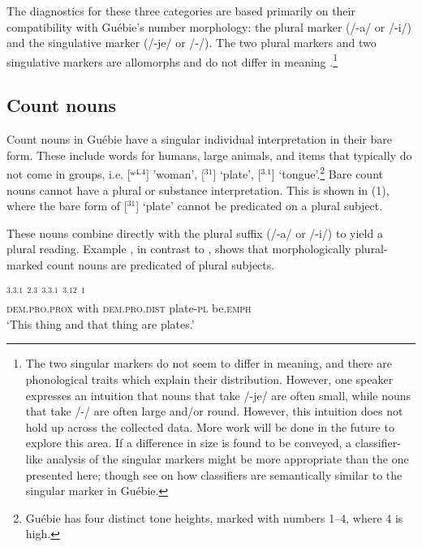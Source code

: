 \documentclass[output=paper,colorlinks,citecolor=brown]{langscibook}
\begin{document}
The diagnostics for these three categories are based primarily on their compatibility with Guébie's number morphology: the plural marker (/-a/ or /-i/) and the singulative marker (/-je/ or /-/). The two plural markers and two singulative markers are allomorphs and do not differ in meaning \citep{Sande2017}.\footnote{The two singular markers do not seem to differ in meaning, and there are phonological traits which explain their distribution. However, one speaker expresses an intuition that nouns that take /-je/ are often small, while nouns that take /-/ are often large and/or round. However, this intuition does not hold up across the collected data. More work will be done in the future to explore this area. If a difference in size is found to be conveyed, a classifier-like analysis of the singular markers might be more appropriate than the one presented here; though see  on how classifiers are semantically similar to the singular marker in Guébie.}

\subsection{Count nouns}\label{sec:sande:2.1}

Count nouns in Guébie have a singular individual interpretation in their bare form. These include words for humans, large animals, and items that typically do not come in groups, i.e. [ʷ$^{4.4}$] 'woman', [$^{31}$]  `plate', [$^{3.1}$] `tongue'.\footnote{Guébie has four distinct tone heights, marked with numbers 1--4, where 4 is high.} Bare count nouns cannot have a plural or substance interpretation. This is shown in (1), where the bare form of [$^{31}$] `plate' cannot be predicated on a plural subject.

\z

These nouns combine directly with the plural suffix (/-a/ or /-i/) to yield a plural reading. Example , in contrast to , shows that morphologically plural-marked count nouns are predicated of plural subjects.

\ea%
    \label{ex:sande:2}
    \gll    {}$^{3.3.1}$ $^{2.3}$ $^{3.3.1}$ $^{3.12}$ $^{1}$\\
	        \textsc{dem.pro.prox} with \textsc{dem.pro.dist} plate\textsc{-pl} be.\textsc{emph}\\
	\glt    `This thing and that thing are plates.'
\z
\end{document}

